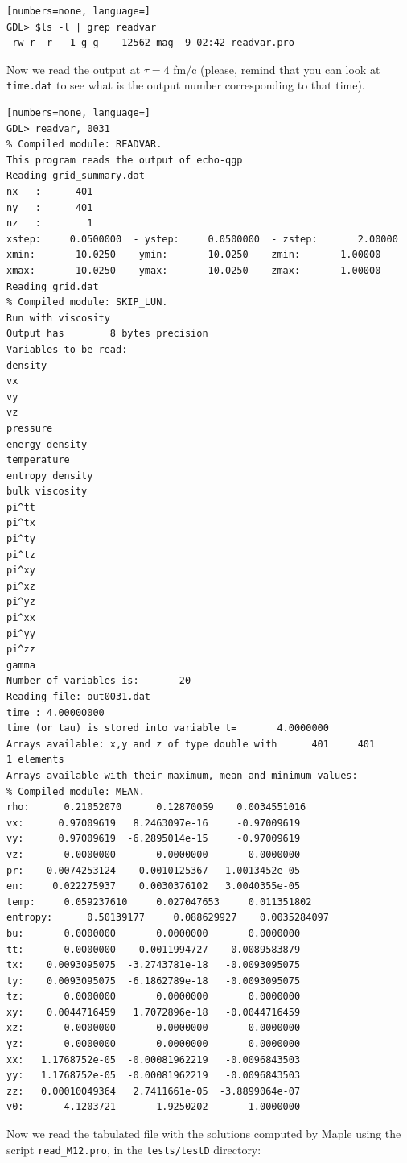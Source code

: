 \begin{lstlisting}[numbers=none, language=]
GDL> $ls -l | grep readvar
-rw-r--r-- 1 g g    12562 mag  9 02:42 readvar.pro
\end{lstlisting}
Now we read the output at $\tau=4$ fm/c (please, remind that you can look at {\tt time.dat} to see what is the output number corresponding to that time).
\begin{lstlisting}[numbers=none, language=]
GDL> readvar, 0031
% Compiled module: READVAR.
This program reads the output of echo-qgp
Reading grid_summary.dat
nx   :      401
ny   :      401
nz   :        1
xstep:     0.0500000  - ystep:     0.0500000  - zstep:       2.00000
xmin:      -10.0250  - ymin:      -10.0250  - zmin:      -1.00000
xmax:       10.0250  - ymax:       10.0250  - zmax:       1.00000
Reading grid.dat
% Compiled module: SKIP_LUN.
Run with viscosity
Output has        8 bytes precision
Variables to be read:
density
vx
vy
vz
pressure
energy density
temperature
entropy density
bulk viscosity
pi^tt
pi^tx
pi^ty
pi^tz
pi^xy
pi^xz
pi^yz
pi^xx
pi^yy
pi^zz
gamma
Number of variables is:       20
Reading file: out0031.dat
time : 4.00000000  
time (or tau) is stored into variable t=       4.0000000
Arrays available: x,y and z of type double with      401     401       1 elements
Arrays available with their maximum, mean and minimum values:
% Compiled module: MEAN.
rho:      0.21052070      0.12870059    0.0034551016
vx:      0.97009619   8.2463097e-16     -0.97009619
vy:      0.97009619  -6.2895014e-15     -0.97009619
vz:       0.0000000       0.0000000       0.0000000
pr:    0.0074253124    0.0010125367   1.0013452e-05
en:     0.022275937    0.0030376102   3.0040355e-05
temp:     0.059237610     0.027047653     0.011351802
entropy:      0.50139177     0.088629927    0.0035284097
bu:       0.0000000       0.0000000       0.0000000
tt:       0.0000000   -0.0011994727   -0.0089583879
tx:    0.0093095075  -3.2743781e-18   -0.0093095075
ty:    0.0093095075  -6.1862789e-18   -0.0093095075
tz:       0.0000000       0.0000000       0.0000000
xy:    0.0044716459   1.7072896e-18   -0.0044716459
xz:       0.0000000       0.0000000       0.0000000
yz:       0.0000000       0.0000000       0.0000000
xx:   1.1768752e-05  -0.00081962219   -0.0096843503
yy:   1.1768752e-05  -0.00081962219   -0.0096843503
zz:   0.00010049364   2.7411661e-05  -3.8899064e-07
v0:       4.1203721       1.9250202       1.0000000
\end{lstlisting}
Now we read the tabulated file with the solutions computed by Maple using the script {\tt read\_M12.pro}, in the {\tt tests/testD} directory:
